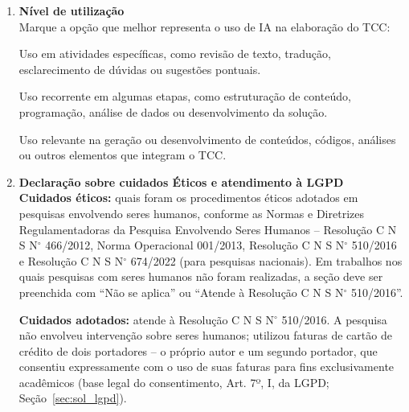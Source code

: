 \begin{anexosenv}
\begin{enumerate}
\vspace{0.42cm}
\noindent\textbf{Ferramenta utilizada:} 

\vspace{0.48cm}
\noindent\formline{\linewidth}

\vspace*{0.45cm}

\item \textbf{Nível de utilização}\\
\noindent Marque a opção que melhor representa o uso de IA na elaboração do TCC:

\vspace{0.38cm}
Uso em atividades específicas, como revisão de texto, tradução, esclarecimento de dúvidas ou sugestões pontuais.

\vspace{0.38cm}
Uso recorrente em algumas etapas, como estruturação de conteúdo, programação, análise de dados ou desenvolvimento da solução.

\vspace{0.38cm}
Uso relevante na geração ou desenvolvimento de conteúdos, códigos, análises ou outros elementos que integram o TCC.

\vspace{0.72cm}
\item \textbf{Declaração sobre cuidados Éticos e atendimento à LGPD}\\
\textbf{Cuidados éticos:} quais foram os procedimentos éticos adotados em pesquisas envolvendo seres humanos, conforme as Normas e Diretrizes Regulamentadoras da Pesquisa Envolvendo Seres Humanos -- Resolução C N S N$^\circ$ 466/2012, Norma Operacional 001/2013, Resolução C N S N$^\circ$ 510/2016 e Resolução C N S N$^\circ$ 674/2022 (para pesquisas nacionais). Em trabalhos nos quais pesquisas com seres humanos não foram realizadas, a seção deve ser preenchida com ``Não se aplica'' ou ``Atende à Resolução C N S N$^\circ$ 510/2016''.

\vspace{0.4cm}
\vspace{0.12cm}
\noindent\checkedbox\hspace{0.12cm}\textbf{Cuidados adotados:} atende à Resolução C N S N$^\circ$ 510/2016. A pesquisa não envolveu intervenção sobre seres humanos; utilizou faturas de cartão de crédito de dois portadores -- o próprio autor e um segundo portador, que consentiu expressamente com o uso de suas faturas para fins exclusivamente acadêmicos (base legal do consentimento, Art. 7º, I, da LGPD; Seção~\ref{sec:sol_lgpd}).


\end{enumerate}
\end{anexosenv}
